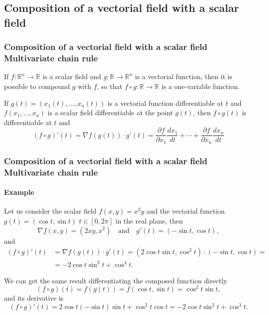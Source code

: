 \subsection{Composition of a vectorial field with a scalar field}
\begin{frame}
\frametitle{Composition of a vectorial field with a scalar field\\ Multivariate chain rule}
If $f:\mathbb{R}^n\rightarrow \mathbb{R}$ is a scalar field and $g:\mathbb{R}\rightarrow \mathbb{R}^n$ is a vectorial function, then it is possible to compound $g$ with $f$, so that $f\circ g:\mathbb{R}\rightarrow \mathbb{R}$ is a one-variable function.

\begin{theorem}
If $g(t)=(x_1(t),\ldots,x_n(t))$ is a vectorial function differentiable at $t$ and $f(x_1,\ldots,x_n)$ is a scalar field differentiable at the point $g(t)$, then $f\circ g(t)$ is differentiable at $t$ and
\[
(f\circ g)'(t) = \nabla f(g(t))\cdot g'(t)=\frac{\partial f}{\partial x_1}\frac{dx_1}{dt}+ \cdots + \frac{\partial f}{\partial x_n}\frac{dx_n}{dt}
\]
\end{theorem}
\end{frame}


\begin{frame}
\frametitle{Composition of a vectorial field with a scalar field\\ Multivariate chain rule}
\framesubtitle{Example}
Let us consider the scalar field $f(x,y)=x^2y$ and the vectorial function $g(t)=(\cos t,\sin t)$ $t\in [0,2\pi]$ in the real plane, then
\[
\nabla f(x,y) = (2xy, x^2) \quad  \mbox{and} \quad g'(t) = (-\sin t, \cos t),
\]
and
\begin{align*}
(f\circ g)'(t) &= \nabla f(g(t))\cdot g'(t) = (2\cos t\sin t,\cos^2 t)\cdot (-\sin t,\cos t) =\\
&= -2\cos t\sin^2 t+\cos^3 t.
\end{align*}

We can get the same result differentiating the composed function directly
\[
(f\circ g)(t) = f(g(t)) = f(\cos t, \sin t) = \cos^2 t\sin t,
\]
and its derivative is
\[
(f\circ g)'(t) = 2\cos t(-\sin t)\sin t+\cos^2 t \cos t = -2\cos t\sin^2 t+\cos^3 t.
\]
\end{frame}



